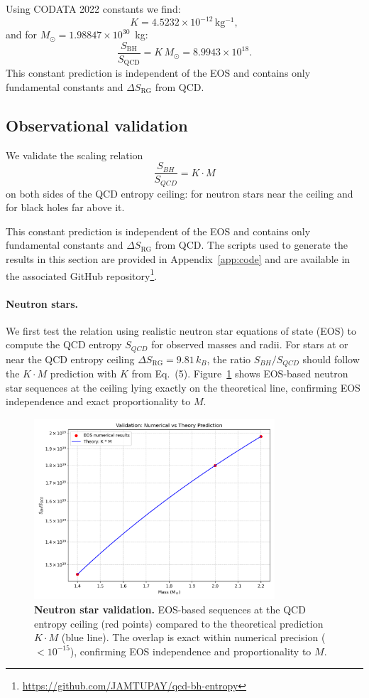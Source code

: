 \documentclass[aps,prd,onecolumn,nofootinbib,superscriptaddress]{revtex4-2}
\begin{document}
Using CODATA 2022 constants we find:
\[
K = 4.5232\times 10^{-12} \,\mathrm{kg^{-1}},
\]
and for $M_\odot = 1.98847\times 10^{30}$~kg:
\[
\frac{S_{\mathrm{BH}}}{S_{\mathrm{QCD}}} = K \, M_\odot = 8.9943\times 10^{18}.
\]
This constant prediction is independent of the EOS and contains only fundamental constants and $\Delta S_{\mathrm{RG}}$ from QCD.

\subsection{Observational validation}

We validate the scaling relation
\[
\frac{S_{BH}}{S_{QCD}} = K \cdot M
\]
on both sides of the QCD entropy ceiling: for neutron stars near the ceiling and for black holes far above it.

This constant prediction is independent of the EOS and contains only fundamental constants and $\Delta S_{\mathrm{RG}}$ from QCD. 
The scripts used to generate the results in this section are provided in Appendix~\ref{app:code} and are available in the associated GitHub repository\footnote{\url{https://github.com/JAMTUPAY/qcd-bh-entropy}}.


\paragraph{Neutron stars.}
We first test the relation using realistic neutron star equations of state (EOS) to compute the QCD entropy $S_{QCD}$ for observed masses and radii. 
For stars at or near the QCD entropy ceiling $\Delta S_{\mathrm{RG}} = 9.81\,k_B$, the ratio $S_{BH}/S_{QCD}$ should follow the $K \cdot M$ prediction with $K$ from Eq.~(5). 
Figure~\ref{fig:ns_validation} shows EOS-based neutron star sequences at the ceiling lying exactly on the theoretical line, confirming EOS independence and exact proportionality to $M$.

\begin{figure}[htbp]
\centering
\includegraphics[width=0.8\textwidth]{figures/validation_plot.png}
\caption{\textbf{Neutron star validation.} 
EOS-based sequences at the QCD entropy ceiling (red points) compared to the theoretical prediction $K \cdot M$ (blue line). 
The overlap is exact within numerical precision ($<10^{-15}$), confirming EOS independence and proportionality to $M$.}
\label{fig:ns_validation}
\end{figure}
\end{document}
